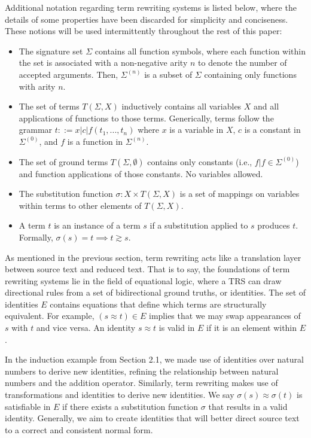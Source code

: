 \documentclass{article}
\begin{document}
Additional notation regarding term rewriting systems is listed below,
where the details of some properties have been discarded for simplicity and conciseness.
These notions will be used intermittently throughout the rest of this paper:
\begin{itemize}
    \item The signature set $\Sigma$ contains all function symbols, where each function within the set is associated with a non-negative arity $n$ to denote the number of accepted arguments. Then, $\Sigma^{(n)}$ is a subset of $\Sigma$ containing only functions with arity $n$.
    \item The set of terms $T(\Sigma, X)$ inductively contains all variables $X$ and all applications of functions to those terms.
    Generically, terms follow the grammar $t ::= x | c | f(t_1, ..., t_n)$ where $x$ is a variable in $X$, $c$ is a constant in $\Sigma^{(0)}$,
    and $f$ is a function in $\Sigma^{(n)}$.
    \item The set of ground terms $T(\Sigma, \emptyset)$ contains only constants (i.e., $f|f \in \Sigma^{(0)}$) and function applications of those constants. No variables allowed.
    \item The substitution function $\sigma: X \times T(\Sigma, X)$ is a set of mappings on variables within terms to other elements of $T(\Sigma, X)$.
    \item A term $t$ is an instance of a term $s$ if a substitution applied to $s$ produces $t$. Formally, $\sigma(s) = t \implies t \gtrsim s$.
\end{itemize}

As mentioned in the previous section, term rewriting acts like a translation layer between source text and reduced text.
That is to say, the foundations of term rewriting systems lie in the field of equational logic,
where a TRS can draw directional rules from a set of bidirectional ground truths, or identities. The set of identities $E$
contains equations that define which terms are structurally equivalent. For example, $(s \approx t) \in E$ implies that
we may swap appearances of $s$ with $t$ and vice versa. An identity $s \approx t$ is valid in $E$ if it is an element within $E$.

In the induction example from Section 2.1,
we made use of identities over natural numbers to derive new identities, refining the relationship between natural numbers and the addition operator.
Similarly, term rewriting makes use of transformations and identities to derive new identities. We say $\sigma(s) \approx \sigma(t)$ is satisfiable in $E$ if
there exists a substitution function $\sigma$ that results in a valid identity. Generally, we aim to create identities that will better direct source text
to a correct and consistent normal form.
\end{document}
